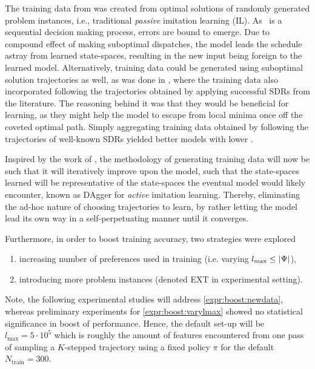 \documentclass[twocolumn]{svjour3}
\begin{document}
The training data from \cite{InRu11a} was created from optimal solutions of 
randomly generated problem instances, i.e., traditional \emph{passive} 
imitation learning (IL). 
As \JSP\ is a sequential decision making process, errors are bound to emerge.  
Due to compound effect of making suboptimal dispatches, the model leads the 
schedule astray from learned state-spaces, resulting in the new input being 
foreign to the learned model. 
Alternatively, training data could be generated using suboptimal solution 
trajectories as well, as was done in \cite{InRu15a}, where the training data 
also incorporated following the trajectories obtained by applying successful 
SDRs from the literature. 
The reasoning behind it was that  they would be beneficial for learning, 
as they might help the model to escape from local minima once off the coveted 
optimal path. 
Simply aggregating training data obtained by following the trajectories of 
well-known SDRs yielded better models with lower \namerho. 

Inspired by the work of \cite{RossB10,RossGB11}, the methodology of generating 
training data will now be such that it will iteratively improve upon the model, 
such that the state-spaces learned will be representative of the state-spaces 
the eventual model would likely encounter, known as DAgger for \emph{active} 
imitation learning.
Thereby, eliminating the ad-hoc nature of choosing trajectories to learn, by 
rather letting the model lead its own way in a self-perpetuating manner until 
it converges.

Furthermore, in order to boost training accuracy, two strategies were explored 
\begin{enumerate}[after={{}}, leftmargin=*,
label={\textbf{Boost.\arabic*}}, ref={{Boost.\arabic*}}]
\item \label{expr:boost:varylmax} increasing number of preferences used 
in training (i.e. varying \mbox{$l_{\max} \leq \lvert\Psi\rvert$}),
\item \label{expr:boost:newdata} introducing more problem instances (denoted 
EXT in experimental setting).
\end{enumerate}
Note, the following experimental studies will address 
\ref{expr:boost:newdata}, whereas preliminary experiments for 
\ref{expr:boost:varylmax} showed no statistical significance in boost of 
performance. Hence, the default set-up will be $l_{\max}=5 \cdot 10^5$ which is 
roughly the amount of features encountered from one pass of sampling a 
\mbox{$K$-stepped} trajectory using a fixed policy $\pi$ for the default 
$N_{\text{train}}=300$. 
\end{document}

